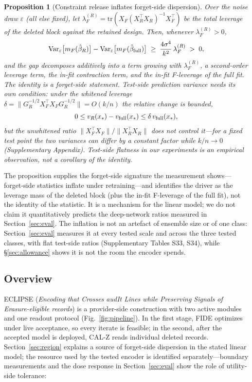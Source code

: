 \documentclass[lettersize,journal]{IEEEtran}
\newtheorem{proposition}[theorem]{Proposition}
\begin{document}
\begin{proposition}[Constraint release inflates forget-side
dispersion]
\label{prop:dispersion}
Over the noise draw $\varepsilon$ (all else fixed), let
$\lambda_F^{(R)} = \mathrm{tr}(X_F (X_R^\top
X_R)^{-1} X_F^\top)$ be the total leverage of the
deleted block against the retained design. Then,
whenever $\lambda_F^{(R)} > 0$,
\begin{equation}
\label{eq:disp}
\mathrm{Var}_\varepsilon\big[m_F(\hat\beta_{R})\big] -
\mathrm{Var}_\varepsilon\big[m_F(\hat\beta_{\rm full})\big]
\;\ge\; \frac{4\sigma^4}{k^2}\,\lambda_F^{(R)} \;>\; 0,
\end{equation}
and the gap decomposes additively into a term growing with
$\lambda_F^{(R)}$, a second-order leverage term, the in-fit
contraction term, and the in-fit F-leverage of the full fit.
The identity is a forget-side statement. Test-side prediction
variance needs its own condition: under the whitened leverage
$\delta = \|G_R^{-1/2} X_F^\top X_F G_R^{-1/2}\| = O(k/n)$ the
relative change is bounded,
\begin{equation}
\label{eq:whiten}
0 \le v_R(x_\ast) - v_{\rm full}(x_\ast) \le
\delta\,v_{\rm full}(x_\ast),
\end{equation}
but
the unwhitened ratio $\|X_F^\top X_F\|/\|X_R^\top X_R\|$ does
not control it---for a fixed test point the two variances can
differ by a constant factor while $k/n \to 0$ (Supplementary
Appendix). Test-side flatness in our experiments is an
empirical observation, not a corollary of the identity.
\end{proposition}

\noindent The proposition supplies the forget-side signature
the measurement shows---forget-side statistics inflate under
retraining---and identifies the driver as the leverage mass
of the deleted block (plus the in-fit F-leverage of the full
fit), not the identity of the statistic. It is a mechanism
for the linear model; we do not claim it quantitatively
predicts the deep-network ratios measured in
Section~\ref{sec:eval}. The inflation is not an artefact of
ensemble size or of one class: Section~\ref{sec:eval}
measures it at every tested scale and across the three tested
classes, with flat test-side ratios (Supplementary Tables
S33, S34), while \S\ref{sec:allowance} shows it is not the
room the encoder spends.

\subsection{Overview}
ECLIPSE (\emph{Encoding that Crosses audIt Lines while Preserving
Signals of Erasure-eligible records}) is a provider-side
construction with two active modules and one readout protocol
(Fig.~\ref{fig:pipeline}). In the first stage, FIDE optimizes
under live acceptance, so every iterate is feasible; in the
second, after the accepted model is deployed, CAL-Z reads
individual deleted records. Section~\ref{sec:region} explains
a source of forget-side dispersion in the stated linear
model; the resource used by the tested encoder is identified
separately---boundary measurements and the dose response in
Section~\ref{sec:eval} show the role of utility-side
tolerance:
\end{document}
